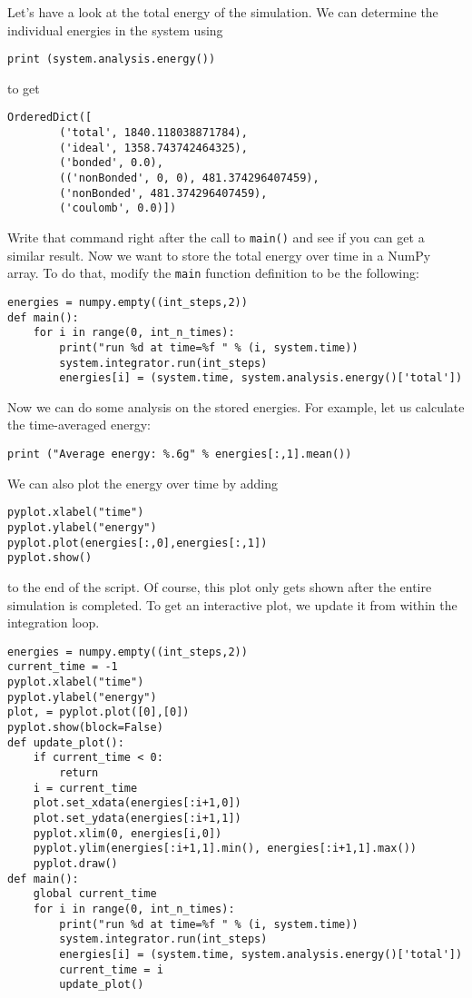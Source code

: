\documentclass[
paper=a4,                       %
fontsize=11pt,                  %
twoside,                        %
footsepline,                    %
headsepline,                    %
headinclude=false,              %
footinclude=false,              %
pagesize,                       %
]{scrartcl}
\begin{document}
Let's have a look at the total energy of the simulation.
We can determine the individual energies in the system using
\begin{lstlisting}
print (system.analysis.energy())
\end{lstlisting}
to get
\begin{lstlisting}
OrderedDict([
        ('total', 1840.118038871784),
        ('ideal', 1358.743742464325),
        ('bonded', 0.0), 
        (('nonBonded', 0, 0), 481.374296407459), 
        ('nonBonded', 481.374296407459), 
        ('coulomb', 0.0)])
\end{lstlisting}
Write that command right after the call to \lstinline{main()} and see if you can get a similar result.
Now we want to store the total energy over time in a NumPy array.
To do that, modify the \lstinline{main} function definition to be the following:
\begin{lstlisting}
energies = numpy.empty((int_steps,2))
def main():
    for i in range(0, int_n_times):
        print("run %d at time=%f " % (i, system.time))
        system.integrator.run(int_steps)
        energies[i] = (system.time, system.analysis.energy()['total'])
\end{lstlisting}
Now we can do some analysis on the stored energies.
For example, let us calculate the time-averaged energy:
\begin{lstlisting}
print ("Average energy: %.6g" % energies[:,1].mean())
\end{lstlisting}
We can also plot the energy over time by adding
\begin{lstlisting}
pyplot.xlabel("time")
pyplot.ylabel("energy")
pyplot.plot(energies[:,0],energies[:,1])
pyplot.show()
\end{lstlisting}
to the end of the script. Of course, this plot only gets shown after the entire simulation is completed.
To get an interactive plot, we update it from within the integration loop.
\begin{lstlisting}
energies = numpy.empty((int_steps,2))
current_time = -1
pyplot.xlabel("time")
pyplot.ylabel("energy")
plot, = pyplot.plot([0],[0])
pyplot.show(block=False)
def update_plot():
    if current_time < 0:
        return
    i = current_time
    plot.set_xdata(energies[:i+1,0])
    plot.set_ydata(energies[:i+1,1])
    pyplot.xlim(0, energies[i,0])
    pyplot.ylim(energies[:i+1,1].min(), energies[:i+1,1].max())
    pyplot.draw()
def main():
    global current_time
    for i in range(0, int_n_times):
        print("run %d at time=%f " % (i, system.time))
        system.integrator.run(int_steps)
        energies[i] = (system.time, system.analysis.energy()['total'])
        current_time = i
        update_plot()
\end{lstlisting}
\end{document}
